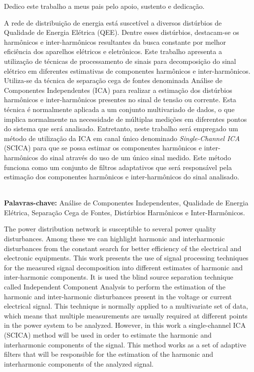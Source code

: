 \documentclass[a4paper,12pt]{monografia}
\theoremstyle{plain}
\theoremstyle{definition}
\theoremstyle{remark}
\begin{document}




\begin{dedicatoria}
Dedico este trabalho a meus pais pelo apoio, sustento e dedicação.
\end{dedicatoria}


 A rede de distribuição de energia está suscetível a diversos distúrbios de Qualidade de Energia Elétrica (QEE). Dentre esses distúrbios, destacam-se os harmônicos e inter-harmônicos resultantes da busca constante por melhor eficiência dos aparelhos elétricos e eletrônicos. Este trabalho apresenta a utilização de técnicas de processamento de sinais para decomposição do sinal elétrico em diferentes estimativas de componentes harmônicos e inter-harmônicos. Utiliza-se da técnica de separação cega de fontes denominada Análise de Componentes Independentes (ICA) para realizar a estimação dos distúrbios harmônicos e inter-harmônicos presentes no sinal de tensão ou corrente. Esta técnica é normalmente aplicada a um conjunto multivariado de dados, o que implica normalmente na necessidade de múltiplas medições em diferentes pontos do sistema que será analisado. Entretanto, neste trabalho será empregado um método de utilização da ICA em canal único denominado \textit{Single-Channel ICA} (SCICA) para que se possa estimar os componentes harmônicos e inter-harmônicos do sinal através do uso de um único sinal medido. Este método funciona como um conjunto de filtros adaptativos que será responsável pela estimação dos componentes harmônicos e inter-harmônicos do sinal analisado.

\noindent \\ \textbf{Palavras-chave:} Análise de Componentes Independentes, Qualidade de Energia Elétrica, Separação Cega de Fontes, Distúrbios Harmônicos e Inter-Harmônicos.



  The power distribution network is susceptible to several power quality disturbances. Among these we can highlight harmonic and interharmonic disturbances from the constant search for better efficiency of the electrical and electronic equipments. This work presents the use of signal processing techniques for the measured signal decomposition into different estimates of harmonic and inter-harmonic components. It is used the blind source separation technique called Independent Component Analysis to perform the estimation of the harmonic and inter-harmonic disturbances present in the voltage or current electrical signal. This technique is normally applied to a multivariate set of data, which means that multiple measurements are usually required at different points in the power system to be analyzed. However, in this work a single-channel ICA (SCICA) method will be used in order to estimate the harmonic and interharmonic components of the signal. This method works as a set of adaptive filters that will be responsible for the estimation of the harmonic and interharmonic components of the analyzed signal.
 
\end{document}
